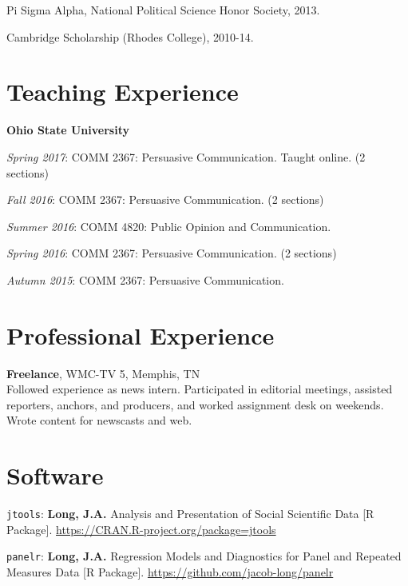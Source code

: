 \documentclass[margin,line]{res}
\begin{document}
\begin{resume}
\vspace*{-2.5mm}
Pi Sigma Alpha, National Political Science Honor Society, 2013.

\vspace*{-2.5mm}
Cambridge Scholarship (Rhodes College), 2010-14.

\section{\sc Teaching Experience}
{\bf Ohio State University}

\vspace*{-2.5mm}
\emph{Spring 2017}: COMM 2367: Persuasive Communication. Taught online. (2 sections)

\vspace*{-2.5mm}
\emph{Fall 2016}: COMM 2367: Persuasive Communication. (2 sections)

\vspace*{-2.5mm}
\emph{Summer 2016}: COMM 4820: Public Opinion and Communication.

\vspace*{-2.5mm}
\emph{Spring 2016}: COMM 2367: Persuasive Communication. (2 sections)

\vspace*{-2.5mm}
\emph{Autumn 2015}: COMM 2367: Persuasive Communication.

\section{\sc Professional Experience}
{\bf Freelance}, WMC-TV 5, Memphis, TN\\
Followed experience as news intern. Participated in editorial meetings, assisted reporters, anchors, and producers, and worked assignment desk on weekends. Wrote content for newscasts and web.



\section{\sc Software} 

\texttt{jtools}: {\bf Long, J.A.} Analysis and Presentation of Social Scientific Data [R Package]. \url{https://CRAN.R-project.org/package=jtools}

\texttt{panelr}: {\bf Long, J.A.} Regression Models and Diagnostics for Panel and Repeated Measures Data [R Package]. \url{https://github.com/jacob-long/panelr}


\end{resume}
\end{document}
